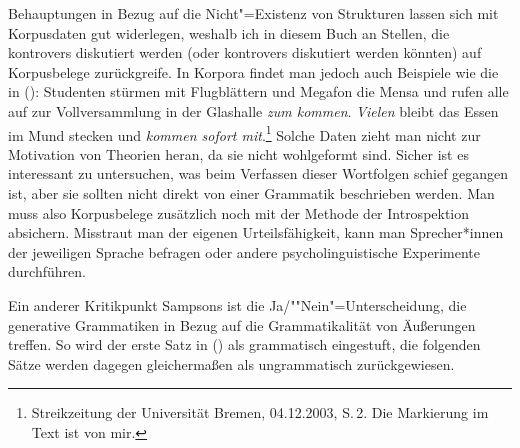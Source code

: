 Behauptungen in Bezug auf die Nicht"=Existenz von Strukturen lassen sich mit Korpusdaten gut widerlegen,
weshalb ich in diesem Buch an Stellen, die kontrovers diskutiert werden (oder kontrovers diskutiert
werden könnten) auf Korpusbelege zurückgreife. In Korpora findet man jedoch auch Beispiele wie die in ():
\ea
Studenten stürmen mit Flugblättern und Megafon die Mensa und rufen alle auf zur Vollversammlung
in der Glashalle \emph{zum kommen}. \emph{Vielen} bleibt das Essen im Mund stecken und \emph{kommen sofort mit}.\footnote{
  Streikzeitung der Universität Bremen, 04.12.2003, S.\,2. Die Markierung im Text ist von mir.%
}
\z
Solche Daten zieht man nicht zur Motivation von Theorien heran, da sie nicht wohlgeformt sind.
Sicher ist es interessant zu untersuchen, was beim Verfassen dieser Wortfolgen schief gegangen ist, aber
sie sollten nicht direkt von einer Grammatik beschrieben werden. Man muss also Korpusbelege zusätzlich
noch mit der Methode der Introspektion absichern. Misstraut man der eigenen Urteilsfähigkeit, kann
man Sprecher*innen der jeweiligen Sprache befragen oder andere psycholinguistische Experimente
durchführen.

\begin{sloppypar}
Ein anderer Kritikpunkt Sampsons ist die Ja/""Nein"=Unterscheidung, die generative Grammatiken in Bezug
auf die Grammatikalität von Äußerungen treffen. So wird der erste Satz in () als grammatisch eingestuft,
die folgenden Sätze werden dagegen gleichermaßen als ungrammatisch zurückgewiesen.
\end{sloppypar}

